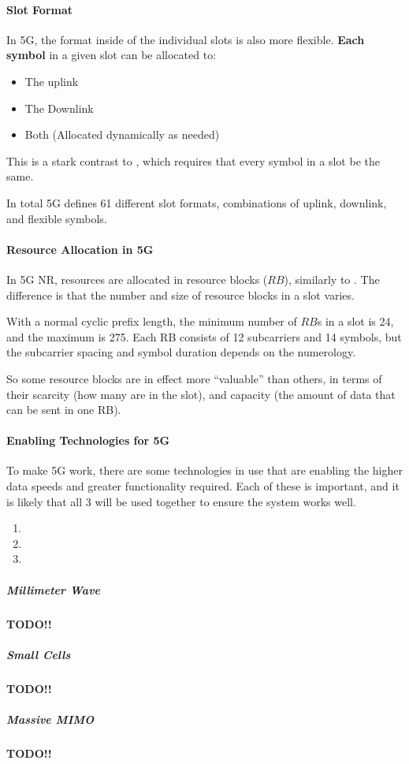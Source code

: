 \paragraph{Slot Format}\label{par:Slot_Format}
In 5G, the format inside of the individual slots is also more flexible.
\textbf{Each symbol} in a given slot can be allocated to:
\begin{itemize}[noitemsep]
\item The uplink
\item The Downlink
\item Both (Allocated dynamically as needed)
\end{itemize}

This is a stark contrast to , which requires that every symbol in a slot be the same.

In total 5G defines 61 different slot formats, combinations of uplink, downlink, and flexible symbols.

\paragraph{Resource Allocation in 5G}\label{par:5G_Resource_Allocation}
In 5G NR, resources are allocated in resource blocks ($RB$), similarly to .
The difference is that the number and size of resource blocks in a slot varies.

With a normal cyclic prefix length, the minimum number of $RB$s in a slot is 24, and the maximum is 275.
Each RB consists of 12 subcarriers and 14 symbols, but the subcarrier spacing and symbol duration depends on the numerology.

So some resource blocks are in effect more “valuable” than others, in terms of their scarcity (how many are in the slot), and capacity (the amount of data that can be sent in one RB).

\paragraph{Enabling Technologies for 5G}\label{par:5G_Enabling_Technologies}
To make 5G work, there are some technologies in use that are enabling the higher data speeds and greater functionality required.
Each of these is important, and it is likely that all 3 will be used together to ensure the system works well.
\begin{enumerate}[noitemsep]
\item {}
\item {}
\item {}
\end{enumerate}

\subparagraph{Millimeter Wave}\label{subpar:Millimeter_Wave}
\textbf{TODO!!}

\subparagraph{Small Cells}\label{subpar:Small_Cells}
\textbf{TODO!!}

\subparagraph{Massive MIMO}\label{subpar:Massive_MIMO}
\textbf{TODO!!}

